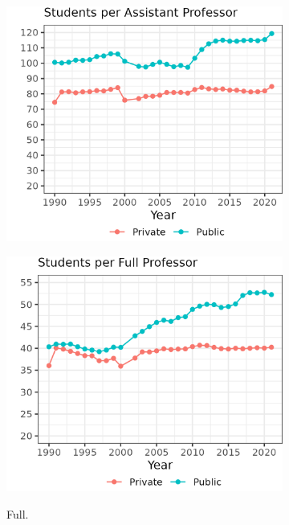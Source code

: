 \begin{figure}[h!]
\begin{subfigure}[b]{0.495\textwidth}
        \includegraphics[width=\textwidth]{figures/assistant-fte-perprof.png}
        \label{fig:assistant-fte-perprof}
    \end{subfigure}
    \begin{subfigure}[b]{0.495\textwidth}
        \centering
        \caption{Full.}
        \includegraphics[width=\textwidth]{figures/full-fte-perprof.png}
        \label{fig:full-fte-perprof}
    \end{subfigure}
    \begin{subfigure}[b]{0.495\textwidth}

\end{subfigure}
\end{figure}

